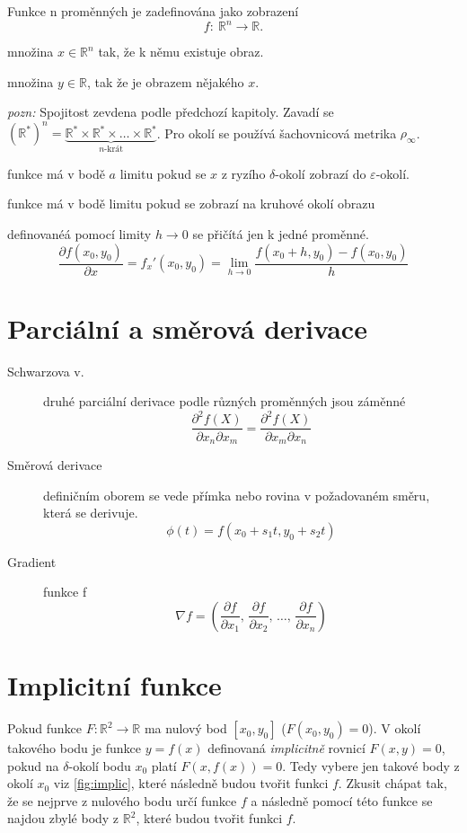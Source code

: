 \documentclass[a4paper, twoside,%
12pt]{article}
\newcommand{\R}{\mathbb{R}}
\newcommand{\pard}[2]{\frac{\partial #1 }{\partial #2 }}
\begin{document}
Funkce n proměnných je zadefinována jako zobrazení 
$$ f:\: \R^n \rightarrow \R. $$
\begin{description}
    \item[Def. obor] množina $x\in\R^n$ tak, že k němu existuje obraz.
    \item[Obor hodnot] množina $y\in\R$, tak že je obrazem nějakého $x$.
    \item \emph{pozn:} Spojitost zevdena podle předchozí kapitoly. Zavadí se  $(\R^*)^n = \underbrace{\R^* \times \R^* \times \dots \times \R^*}_{n\text{-krát}}$. Pro okolí se používá šachovnicová metrika $\rho_\infty$.
    \item[Limita funkce] funkce má v bodě $a$ limitu pokud se $x$ z ryzího $\delta$-okolí zobrazí do $\varepsilon$-okolí.
    \item[věta 6.7] funkce má v bodě limitu pokud se zobrazí na kruhové okolí obrazu
    \item[parciální derivace] definovanéá pomocí limity $h\to 0$ se přičítá jen k jedné proměnné.
    $$\pard{f(x_0, y_0)}{x} =  f_x' (x_0, y_0) = \lim_{h\to 0} \frac{f(x_0+h,y_0) - f(x_0, y_0)}{h} $$
\end{description}

\section{Parciální a směrová derivace}

\begin{description}    
    \item[Schwarzova v.] druhé parciální derivace podle různých proměnných jsou záměnné
    $$ \frac{\partial^2 f(X)}{\partial x_n \partial x_m} = \frac{\partial^2 f(X)}{\partial x_m \partial x_n} $$
    \item[Směrová derivace] definičním oborem se vede přímka nebo rovina v požadovaném směru, která se derivuje.
    $$ \phi(t) = f(x_0 + s_1 t, y_0 + s_2 t)  $$
    \item[Gradient] funkce f
    $$\nabla f = \left( \pard{f}{x_1},\, \pard{f}{x_2}, \,\dots ,\, \pard{f}{x_n}  \right)$$  
\end{description}

\section{Implicitní funkce}

Pokud funkce $F: \R^2 \to \R$ ma nulový bod $[x_0, y_0]$ ($F(x_0, y_0)=0$). V okolí takového bodu je funkce $y=f(x)$ definovaná \emph{implicitně} rovnicí $F(x,y)=0$, pokud na $\delta$-okolí bodu $x_0$ platí $F(x,f(x))=0$. Tedy vybere jen takové body z okolí $x_0$ viz \ref{fig:implic}, které následně budou tvořit funkci $f$.
{\small Zkusit chápat tak, že se nejprve z nulového bodu určí funkce $f$ a následně pomocí této funkce se najdou zbylé body z $\R^2$, které budou tvořit funkci $f$.}
\end{document}
